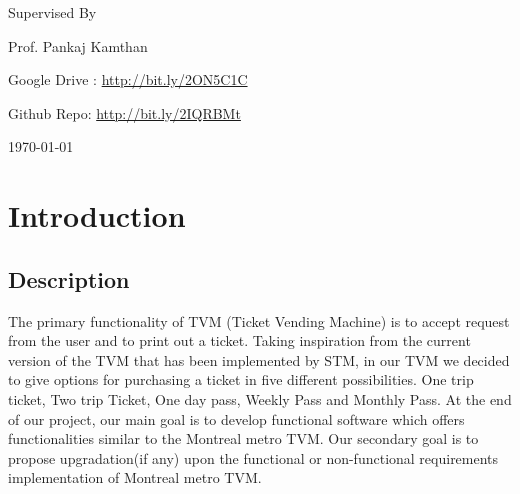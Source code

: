 \documentclass[15pt]{article}
\begin{document}
\begin{titlepage}
    \vspace{0.5cm}

	\vfill

	\vspace{0.2cm}
	{\large Supervised By} \par
    \vspace{0.2cm}
	{\Large Prof. Pankaj Kamthan}

	\vfill
	{\Large Google Drive : \url{http://bit.ly/2ON5C1C}\par}
	\vspace{0.2cm}
    {\Large Github Repo: \url{http://bit.ly/2IQRBMt}}

	\vfill

	{\large \today\par}
	\par
    
\end{titlepage}


\renewcommand{\cftpartfont}{\Large\bfseries}
\renewcommand\cftsecfont{\Large\bfseries}
\renewcommand\cftsecpagefont{\Large\bfseries}
\renewcommand{\cftsubsecfont}{\Large\bfseries}
\renewcommand{\cftsubsecpagefont}{\Large\bfseries}
\renewcommand\cftsecafterpnum{\par\addvspace{6pt}}
\renewcommand\cftloftitlefont{\Large\bfseries}
\renewcommand\cftfigfont{\Large\bfseries}
\renewcommand\cftfigpagefont{\Large\bfseries}




\doublespacing
\tableofcontents
\singlespacing
\setlength{\cftparskip}{1\baselineskip}
\listoffigures

\subsectionfont{\Large}



\newpage
\section{\Large{Introduction}}
\subsection{\Large{Description}}
\Large{The primary functionality of TVM (Ticket Vending Machine) is to accept request from the user and to print out a ticket\cite{fernandes2016requirements}. Taking inspiration from the current version of the TVM that has been implemented by STM, in our TVM we decided to give options for purchasing a ticket in five different possibilities. One trip ticket, Two trip Ticket, One day pass, Weekly Pass and Monthly Pass. At the end of our project, our main goal is to develop functional software which offers functionalities similar to the Montreal metro TVM\cite{kulak2012use}. Our secondary goal is to propose upgradation(if any) upon the functional or non-functional requirements implementation of Montreal metro TVM.}
\end{document}
